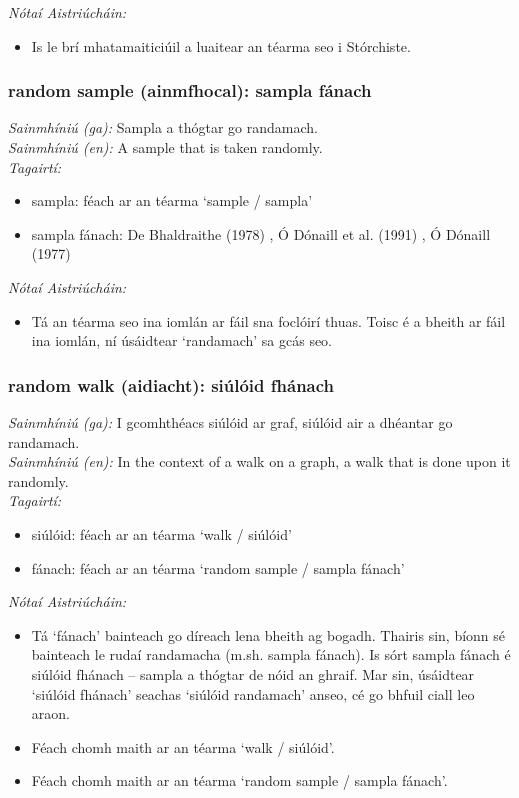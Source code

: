  \noindent \textit{Nótaí Aistriúcháin:}
\begin{itemize}
	\item Is le brí mhatamaiticiúil a luaitear an téarma seo i Stórchiste.
\end{itemize}


\subsubsection*{random sample (ainmfhocal): sampla fánach}
 \noindent \textit{Sainmhíniú (ga):} Sampla a thógtar go randamach.
\\
 \noindent \textit{Sainmhíniú (en):} A sample that is taken randomly.
\\
 \noindent \textit{Tagairtí:}
\begin{itemize}
	\item sampla: féach ar an téarma `sample / sampla'
	\item sampla fánach: De Bhaldraithe (1978) \cite{de-bhaldraithe}, Ó Dónaill et al. (1991) \cite{focloir-beag}, Ó Dónaill (1977) \cite{odonaill}
\end{itemize}

 \noindent \textit{Nótaí Aistriúcháin:}
\begin{itemize}
	\item Tá an téarma seo ina iomlán ar fáil sna foclóirí thuas. Toisc é a bheith ar fáil ina iomlán, ní úsáidtear `randamach' sa gcás seo.
\end{itemize}


\subsubsection*{random walk (aidiacht): siúlóid fhánach}
 \noindent \textit{Sainmhíniú (ga):} I gcomhthéacs siúlóid ar graf, siúlóid air a dhéantar go randamach.
\\
 \noindent \textit{Sainmhíniú (en):} In the context of a walk on a graph, a walk that is done upon it randomly.
\\
 \noindent \textit{Tagairtí:}
\begin{itemize}
	\item siúlóid: féach ar an téarma `walk / siúlóid'
	\item fánach: féach ar an téarma `random sample / sampla fánach'
\end{itemize}

 \noindent \textit{Nótaí Aistriúcháin:}
\begin{itemize}
	\item Tá `fánach' bainteach go díreach lena bheith ag bogadh. Thairis sin, bíonn sé bainteach le rudaí randamacha (m.sh. sampla fánach). Is sórt sampla fánach é siúlóid fhánach -- sampla a thógtar de nóid an ghraif. Mar sin, úsáidtear `siúlóid fhánach' seachas `siúlóid randamach' anseo, cé go bhfuil ciall leo araon.
	\item Féach chomh maith ar an téarma `walk / siúlóid'.
	\item Féach chomh maith ar an téarma `random sample / sampla fánach'.
\end{itemize}


